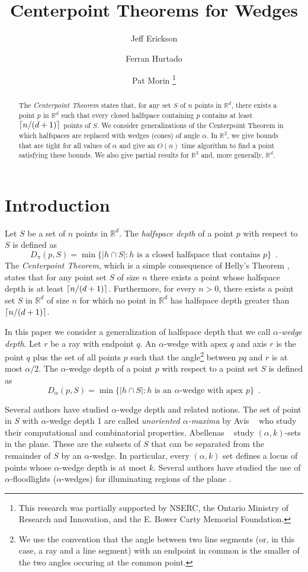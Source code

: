 \documentclass{dmtcs}
\title{Centerpoint Theorems for Wedges}
\author{Jeff Erickson\addressmark{1} \and
	Ferran Hurtado\addressmark{2} \and
	Pat Morin\addressmark{3}%
	\thanks{This research was partially supported by NSERC, the
Ontario Ministry of Research and Innovation, and the E. Bower Carty
Memorial Foundation.}}
\newcommand{\R}{\mathbb{R}}
\begin{document}
\maketitle

\begin{abstract}
The \emph{Centerpoint Theorem} states that, for any set $S$ of $n$
points in $\R^d$, there exists a point $p$ in $\R^d$
such that every closed halfspace containing $p$ contains at least
$\left\lceil n/(d+1) \right\rceil$ points of $S$.  We consider generalizations of the
Centerpoint Theorem in which halfspaces are replaced with wedges
(cones) of angle $\alpha$.  In $\R^2$, we give bounds that are tight
for all values of $\alpha$ and give an $O(n)$ time algorithm to find a
point satisfying these bounds.  We also give partial results for 
$\R^3$ and, more generally, $\R^d$.
\end{abstract}

\section{Introduction}

Let $S$ be a set of $n$ points in $\R^d$.  The \emph{halfspace
depth} \cite{t75} of a point $p$ with respect to $S$ is defined as
\[
D_\pi(p,S) = 
   \min\{|h\cap S| : \mbox{$h$ is a closed halfspace that contains $p$} \}
    \enspace .
\]
The \emph{Centerpoint Theorem}, which is a simple consequence of
Helly's Theorem \cite{e93}, states that for any point set $S$ of size
$n$ there exists a point whose halfspace depth is at least
$\left\lceil n/(d+1) \right\rceil$.  Furthermore, for every $n>0$, there exists a point
set $S$ in $\R^d$ of size $n$ for which no point in
$\R^d$ has halfspace depth greater than $\left\lceil n/(d+1) \right\rceil$. 

In this paper we consider a generalization of halfspace depth that we
call \emph{$\alpha$-wedge depth}. Let $r$ be a ray with endpoint $q$.
An $\alpha$-wedge with apex $q$ and axis $r$ is the point $q$ plus 
the set of all points
$p$ such that the angle\footnote{We use the convention that the angle
between two line segments (or, in this case, a ray and a line segment)
with an endpoint in common is the smaller of the two angles occuring
at the common point.} between $pq$ and $r$ is at most $\alpha/2$.  The
$\alpha$-wedge depth of a point $p$ with respect to a point set $S$ is
defined as
\[
D_\alpha(p,S) =
   \min\{|h\cap S| : \mbox{$h$ is an $\alpha$-wedge with apex $p$} \} 
   \enspace .
\]

Several authors have studied $\alpha$-wedge depth and related notions.
The set of point in $S$ with $\alpha$-wedge depth 1 are called
\emph{unoriented $\alpha$-maxima} by Avis \etal\ \cite{abd99} who study
their computational and combinatorial properties.  Abellenas \etal\
\cite{achs02} study $(\alpha,k)$-sets in the plane.  These are the
subsets of $S$ that can be separated from the remainder of $S$ by an
$\alpha$-wedge.  In particular, every $(\alpha,k)$ set defines a locus
of points whose $\alpha$-wedge depth is at most $k$.  Several authors
have studied the use of $\alpha$-floodlights ($\alpha$-wedges) for
illuminating regions of the plane \cite{ecoux95,mo01}.
\end{document}
